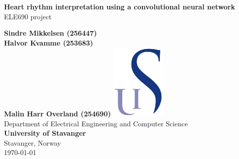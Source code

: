 \begin{titlepage}
    \begin{center}
        \vspace*{1cm}
        \textbf{\huge Heart rhythm interpretation using a convolutional neural network}\\
        \vspace{0.5cm}
        ELE690 project\\
        
        \vspace{1.5cm}

        \textbf{Sindre Mikkelsen (256447) \\ Halvor Kvamme (253683) \\Malin Harr Overland (254690)}
        \vfill
        \includegraphics[width=0.2\textwidth]{Img/UiS_Logo.svg.png}\\
        \vspace{0.9cm}
        Department of Electrical Engineering and Computer Science\\
        \textbf{University of Stavanger}\\
        Stavanger, Norway \\
        \vspace{0.8cm}
        \today
    \end{center}
\end{titlepage}